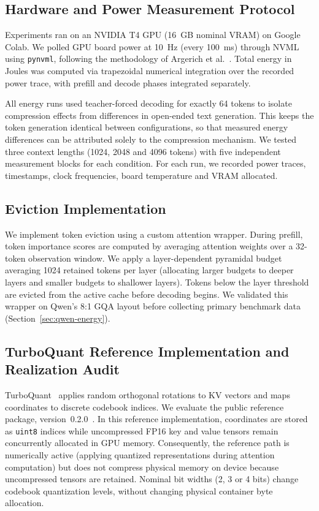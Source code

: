 \documentclass[sigconf,nonacm]{acmart}
\begin{document}
\subsection{Hardware and Power Measurement Protocol}

Experiments ran on an NVIDIA T4 GPU (16~GB nominal VRAM) on Google Colab. We polled GPU board power at 10~Hz (every 100~ms) through NVML~\cite{nvidia2024nvml} using \texttt{pynvml}, following the methodology of Argerich et al.~\cite{argerich_watt_2026}. Total energy in Joules was computed via trapezoidal numerical integration over the recorded power trace, with prefill and decode phases integrated separately.

All energy runs used teacher-forced decoding for exactly 64 tokens to isolate compression effects from differences in open-ended text generation. This keeps the token generation identical between configurations, so that measured energy differences can be attributed solely to the compression mechanism. We tested three context lengths (1024, 2048 and 4096 tokens) with five independent measurement blocks for each condition. For each run, we recorded power traces, timestamps, clock frequencies, board temperature and VRAM allocated.

\subsection{Eviction Implementation}

We implement token eviction using a custom attention wrapper. During prefill, token importance scores are computed by averaging attention weights over a 32-token observation window. We apply a layer-dependent pyramidal budget averaging 1024 retained tokens per layer (allocating larger budgets to deeper layers and smaller budgets to shallower layers). Tokens below the layer threshold are evicted from the active cache before decoding begins. We validated this wrapper on Qwen's 8:1 GQA layout before collecting primary benchmark data (Section~\ref{sec:qwen-energy}).

\subsection{TurboQuant Reference Implementation and Realization Audit}

TurboQuant~\cite{zandieh2026turboquant} applies random orthogonal rotations to KV vectors and maps coordinates to discrete codebook indices. We evaluate the public reference package, version~0.2.0~\cite{zandieh_turboquant_v020}. In this reference implementation, coordinates are stored as \texttt{uint8} indices while uncompressed FP16 key and value tensors remain concurrently allocated in GPU memory. Consequently, the reference path is numerically active (applying quantized representations during attention computation) but does not compress physical memory on device because uncompressed tensors are retained. Nominal bit widths (2, 3 or 4 bits) change codebook quantization levels, without changing physical container byte allocation.
\end{document}
